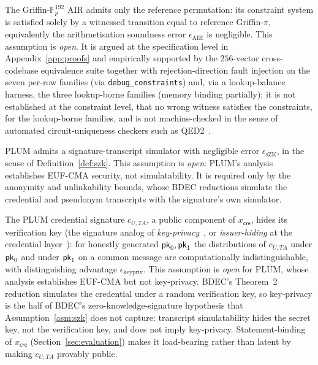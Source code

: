 \begin{assumption}\label{asm:air}
    The Griffin-$\mathbb{F}_p^{192}$ AIR admits only the reference permutation: its constraint system is satisfied solely by a witnessed transition equal to reference Griffin-$\pi$, equivalently the arithmetisation soundness error $\epsilon_{\mathrm{AIR}}$ is negligible. This assumption is \emph{open}. It is argued at the specification level in Appendix~\ref{app:proofs} and empirically supported by the $256$-vector cross-codebase equivalence suite together with rejection-direction fault injection on the seven per-row families (via \texttt{debug\_constraints}) and, via a lookup-balance harness, the three lookup-borne families (memory binding partially); it is not established at the constraint level, that no wrong witness satisfies the constraints, for the lookup-borne families, and is not machine-checked in the sense of automated circuit-uniqueness checkers such as QED2~\cite{pailoor2023qed2}.
\end{assumption}

\begin{assumption}\label{asm:szk}
    PLUM admits a signature-transcript simulator with negligible error $\epsilon_{\mathrm{sZK}}$, in the sense of Definition~\ref{def:szk}. This assumption is \emph{open}: PLUM's analysis establishes EUF-CMA security, not simulatability. It is required only by the anonymity and unlinkability bounds, whose BDEC reductions simulate the credential and pseudonym transcripts with the signature's own simulator.
\end{assumption}

\begin{assumption}\label{asm:keypriv}
    The PLUM credential signature $c_{U,TA}$, a public component of $x_{\mathsf{cre}}$, hides its verification key (the signature analog of \emph{key-privacy}~\cite{bellare2001keyprivacy}, or \emph{issuer-hiding} at the credential layer~\cite{bobolz2021issuerhiding}): for honestly generated $\mathsf{pk}_0,\mathsf{pk}_1$ the distributions of $c_{U,TA}$ under $\mathsf{pk}_0$ and under $\mathsf{pk}_1$ on a common message are computationally indistinguishable, with distinguishing advantage $\epsilon_{\mathrm{keypriv}}$. This assumption is \emph{open} for PLUM, whose analysis establishes EUF-CMA but not key-privacy. BDEC's Theorem~2 reduction simulates the credential under a random verification key, so key-privacy is the half of BDEC's zero-knowledge-signature hypothesis that Assumption~\ref{asm:szk} does not capture: transcript simulatability hides the secret key, not the verification key, and does not imply key-privacy. Statement-binding of $x_{\mathsf{cre}}$ (Section~\ref{sec:evaluation}) makes it load-bearing rather than latent by making $c_{U,TA}$ provably public.
\end{assumption}

